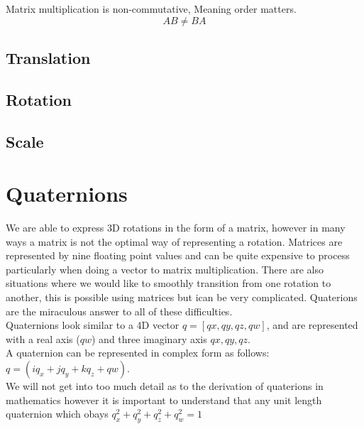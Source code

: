 \begin{flushleft}
Matrix multiplication is non-commutative, Meaning order matters.
\begin{equation}
AB \neq BA
\end{equation}
\end{flushleft}



\subsection{Translation}



\subsection{Rotation}

\subsection{Scale}


\section{Quaternions}

\begin{flushleft}
We are able to express 3D rotations in the form of a matrix, however in many ways a matrix is not the optimal way of representing a rotation. Matrices are represented by nine floating point values and can be quite expensive to process particularly when doing a vector to matrix multiplication. There are also situations where we would like to smoothly transition from one rotation to another, this is possible using matrices but ican be very complicated. Quaterions are the miraculous answer to all of these difficulties.\\
Quaternions look similar to a 4D vector $ q = [qx, qy, qz, qw]$, and are represented with a real axis ($qw$) and three imaginary axis $qx, qy, qz$.\\
A quaternion can be represented in complex form as follows: $q = (iq_x + jq_y + kq_z + qw)$. \\ 
We will not get into too much detail as to the derivation of quaterions in mathematics however it is important to understand that any unit length quaternion which obays $q_x^2 + q_y^2 + q_z^2 + q_w^2 = 1$ \\ 

\end{flushleft}

